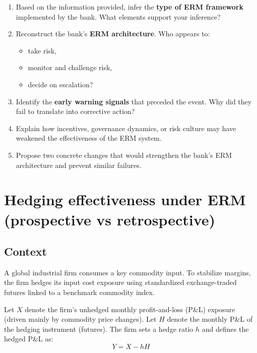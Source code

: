 \documentclass[11pt]{article}
\begin{document}
\begin{enumerate}
    \item Based on the information provided, infer the \textbf{type of ERM
    framework} implemented by the bank. What elements support your inference?

    \item Reconstruct the bank’s \textbf{ERM architecture}. Who appears to:
    \begin{itemize}
        \item[$\bullet$] take risk,
        \item[$\bullet$] monitor and challenge risk,
        \item[$\bullet$] decide on escalation?
    \end{itemize}

    \item Identify the \textbf{early warning signals} that preceded the event.
    Why did they fail to translate into corrective action?

    \item Explain how incentives, governance dynamics, or risk culture may have
    weakened the effectiveness of the ERM system.

    \item Propose two concrete changes that would strengthen the bank’s ERM
    architecture and prevent similar failures.
\end{enumerate}

\pagebreak

\section{Hedging effectiveness under ERM (prospective vs retrospective)}

\subsection*{Context}

A global industrial firm consumes a key commodity input. To stabilize margins,
the firm hedges its input cost exposure using standardized exchange-traded
futures linked to a benchmark commodity index.

Let $X$ denote the firm’s unhedged monthly profit-and-loss (P\&L) exposure
(driven mainly by commodity price changes). Let $H$ denote the monthly P\&L of
the hedging instrument (futures). The firm sets a hedge ratio $h$ and defines
the hedged P\&L as:
\[
Y = X - hH
\]
\end{document}
